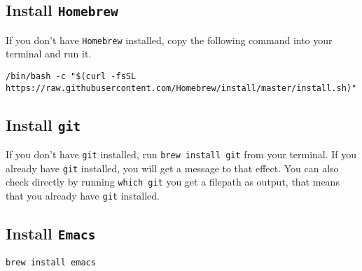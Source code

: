 \documentclass[a4paper]{article}
\begin{document}
\subsection{Install \texttt{Homebrew}}
\label{sec:orgea0b082}
If you don't have \texttt{Homebrew} installed, copy the following command into your terminal and run it.


\begin{verbatim}
/bin/bash -c "$(curl -fsSL https://raw.githubusercontent.com/Homebrew/install/master/install.sh)"
\end{verbatim}

\subsection{Install \texttt{git}}
\label{sec:org50ee339}
   If you don't have \texttt{git} installed, run \texttt{brew install git} from your terminal.
If you already have \texttt{git} installed, you will get a message to that effect. You can also check directly by running
\texttt{which git} you get a filepath as output, that means that you already have \texttt{git} installed.

\subsection{Install \texttt{Emacs}}
\label{sec:org397b5e4}

\begin{verbatim}
brew install emacs
\end{verbatim}
\end{document}
